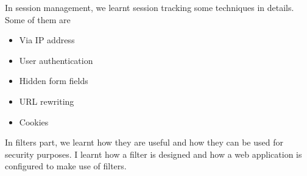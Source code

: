 In session management, we learnt session tracking some techniques in details. Some of them are
\begin{itemize}
  \item Via IP address
  \item User authentication
  \item Hidden form fields
  \item URL rewriting
  \item Cookies
\end{itemize}

In filters part, we learnt how they are useful and how they can be used for security purposes. I learnt how a filter is designed and how a web application is configured to make use of filters.
